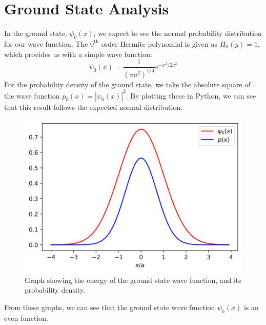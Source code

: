 \documentclass[a4paper]{article}
\begin{document}
\section{Ground State Analysis}
In the ground state, $\psi_0(x)$, we expect to see the normal probability distribution for our wave function. The $0^\text{th}$ order Hermite polynomial is given as $H_0(y)=1$, which provides us with a simple wave function:
\begin{equation}
\psi_0(x)=\frac1{(\pi a^2)^{1/4}}e^{-x^2/2a^2}
\end{equation}
For the probability density of the ground state, we take the absolute square of the wave function $p_0(x)=|\psi_0(x)|^2$. By plotting these in Python, we can see that this result follows the expected normal distribution.
\begin{figure}[h!]
\centerline{\includegraphics[scale=0.7]{ground_state.png}}
\caption{Graph showing the energy of the ground state wave function, and its probability density.}
\label{fig:ground_state}
\end{figure}
From these graphs, we can see that the ground state wave function $\psi_0(x)$ is an even function.
\end{document}

